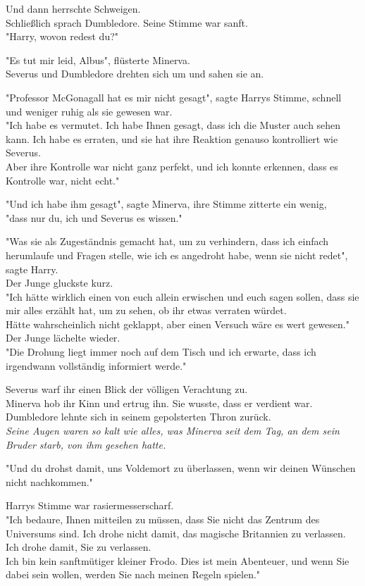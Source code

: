 {Und dann herrschte Schweigen.\\ Schließlich sprach Dumbledore. Seine Stimme war sanft.\\ "Harry, wovon redest du?"

"Es tut mir leid, Albus", flüsterte Minerva.\\ Severus und Dumbledore drehten sich um und sahen sie an.

"Professor McGonagall hat es mir nicht gesagt", sagte Harrys Stimme, schnell und weniger ruhig als sie gewesen war.\\ "Ich habe es vermutet. Ich habe Ihnen gesagt, dass ich die Muster auch sehen kann. Ich habe es erraten, und sie hat ihre Reaktion genauso kontrolliert wie Severus.\\ Aber ihre Kontrolle war nicht ganz perfekt, und ich konnte erkennen, dass es Kontrolle war, nicht echt."

"Und ich habe ihm gesagt", sagte Minerva, ihre Stimme zitterte ein wenig,\\ "dass nur du, ich und Severus es wissen."

"Was sie als Zugeständnis gemacht hat, um zu verhindern, dass ich einfach herumlaufe und Fragen stelle, wie ich es angedroht habe, wenn sie nicht redet", sagte Harry.\\ Der Junge gluckste kurz.\\ "Ich hätte wirklich einen von euch allein erwischen und euch sagen sollen, dass sie mir alles erzählt hat, um zu sehen, ob ihr etwas verraten würdet.\\ Hätte wahrscheinlich nicht geklappt, aber einen Versuch wäre es wert gewesen."\\ Der Junge lächelte wieder.\\ "Die Drohung liegt immer noch auf dem Tisch und ich erwarte, dass ich irgendwann vollständig informiert werde."

Severus warf ihr einen Blick der völligen Verachtung zu.\\ Minerva hob ihr Kinn und ertrug ihn. Sie wusste, dass er verdient war.\\ Dumbledore lehnte sich in seinem gepolsterten Thron zurück.\\ \emph{Seine Augen waren so kalt wie alles, was Minerva seit dem Tag, an dem sein Bruder starb, von ihm gesehen hatte.}

"Und du drohst damit, uns Voldemort zu überlassen, wenn wir deinen Wünschen nicht nachkommen."

Harrys Stimme war rasiermesserscharf.\\ "Ich bedaure, Ihnen mitteilen zu müssen, dass Sie nicht das Zentrum des Universums sind. Ich drohe nicht damit, das magische Britannien zu verlassen. Ich drohe damit, Sie zu verlassen.\\ Ich bin kein sanftmütiger kleiner Frodo. Dies ist mein Abenteuer, und wenn Sie dabei sein wollen, werden Sie nach meinen Regeln spielen."

}
